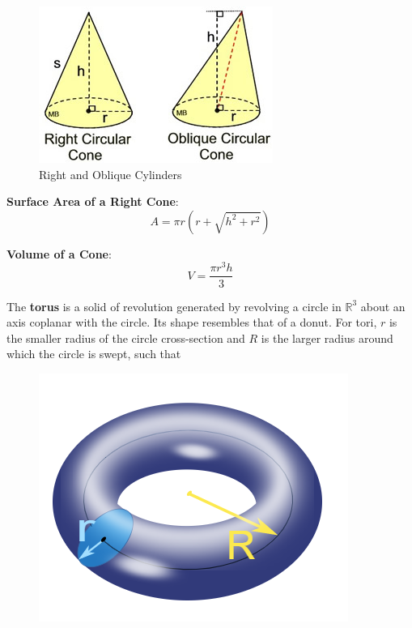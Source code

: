 \documentclass{article}
\begin{document}
            \begin{figure} [hbt!]
                \centering
                \includegraphics[scale=0.5]{Resources/Unit6Solids/cones.jpg}
                \caption*{Right and Oblique Cylinders}
            \end{figure}

            \noindent \color{purple} \textbf{Surface Area of a Right Cone}: \color{black} \\

            \begin{equation*}
                A=\pi r(r+\sqrt{h^2+r^2})
            \end{equation*}

            \noindent \color{purple} \textbf{Volume of a Cone}: \color{black} \\

            \begin{equation*}
                V = \frac{\pi r^3h}{3}
            \end{equation*}

            \noindent The \textbf{torus} is a solid of revolution generated by revolving a
            circle in $\mathbb{R}^3$ about an axis coplanar with the circle. Its shape resembles
            that of a donut. For tori, $r$ is the smaller radius of the circle cross-section and
            $R$ is the larger radius around which the circle is swept, such that \\

            \begin{figure} [hbt!]
                \centering
                \includegraphics[scale=0.5]{Resources/Unit6Solids/torus.png}
            \end{figure}
\end{document}

